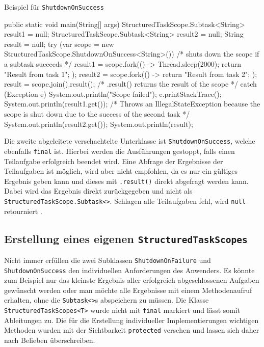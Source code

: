     \begin{program} [H]
        \caption{Beispiel für \texttt{ShutdownOnSuccess}}
        \label{prog:BeispielFürShutdownSuccess}
    \begin{JavaCode}[language=Java, numbers=left]
public static void main(String[] args) {
    StructuredTaskScope.Subtask<String> result1 = null;
    StructuredTaskScope.Subtask<String> result2 = null;
    String result = null;
    try (var scope = new StructuredTaskScope.ShutdownOnSuccess<String>()) {                 
                                            /* shuts down the scope if a subtask 
                                               succeeds */
        result1 = scope.fork(() -> {
            Thread.sleep(2000);
            return "Result from task 1";
        });
        result2 = scope.fork(() -> {
            return "Result from task 2";
        });
        result = scope.join().result();     /* .result() returns the result of the 
                                               scope */
    } catch (Exception e) {
        System.out.println("Scope failed");
        e.printStackTrace();
    }
    System.out.println(result1.get());      /* Throws an IllegalStateException
                                               because the scope is shut down due to
                                               the success of the second task */
    System.out.println(result2.get());
    System.out.println(result);
}\end{JavaCode}
    \end{program}
    Die zweite abgeleitete verschachtelte Unterklasse ist \texttt{ShutdownOnSuccess}, welche ebenfalls \texttt{final} ist. Hierbei werden die Ausführungen gestoppt, falls
    einen Teilaufgabe erfolgreich beendet wird. Eine Abfrage der Ergebnisse der Teilaufgaben ist möglich, wird aber nicht empfohlen, da es nur ein gültiges
    Ergebnis geben kann
    und dieses mit \texttt{.result()} direkt abgefragt werden kann. Dabei wird das Ergebnis direkt zurückgegeben und nicht als \texttt{StructuredTaskScope.Subtask<>}.
    Schlagen alle Teilaufgaben fehl, wird \texttt{null} retourniert \cite{ShutdownOnSuccess}.

\subsection{Erstellung eines eigenen \texttt{StructuredTaskScopes}}
\label{subsec:ErstellungEinesEigenenSts?}

    Nicht immer erfüllen die zwei Subklassen \texttt{ShutdownOnFailure} und \texttt{ShutdownOnSuccess} den individuellen Anforderungen des Anwenders.
    Es könnte zum Beispiel nur das kleinste Ergebnis aller erfolgreich abgeschlossenen Aufgaben gewünscht werden oder man möchte alle Ergebnisse mit
    einem Methodenaufruf erhalten, ohne die \texttt{Subtask<>}s abspeichern zu müssen.
    Die Klasse \texttt{StructuredTaskScopes<T>} wurde nicht mit \texttt{final} markiert und lässt somit Ableitungen zu. Die für die Erstellung individueller Implementierungen wichtigen
    Methoden wurden mit der Sichtbarkeit \texttt{protected} versehen und lassen sich daher nach Belieben überschreiben.

